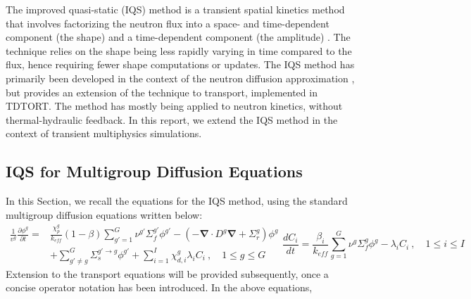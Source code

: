 \documentclass[12pt]{scrartcl}
\renewcommand{\div}{\bs{\nabla}\! \cdot \!}
\newcommand{\grad}{\bs{\nabla}}
\newcommand{\bs}[1]{\mathbf{#1}}
\newcommand{\keff}{k_\textit{eff}}
\newcommand{\be}{\begin{equation}}
\newcommand{\ee}{\end{equation}}
\begin{document}
\par
The improved quasi-static (IQS) method is a transient spatial kinetics method that involves factorizing the neutron flux into a space- and time-dependent component (the shape) and a time-dependent component (the amplitude) \cite{Ott_1966,Dulla2008}. The technique relies on the shape being less rapidly varying in time compared to the flux, hence requiring fewer shape computations or updates. The IQS method has primarily been developed in the context of the neutron diffusion approximation \cite{Ban_2012,Ferguson_1973}, but \cite{Goluoglu_2001} provides an extension of the technique to transport, implemented in TDTORT. The method has mostly being applied to neutron kinetics, without thermal-hydraulic feedback. In this report, we extend the IQS method in the context of transient multiphysics simulations.


\subsection{IQS for Multigroup Diffusion Equations}

In this Section, we recall the equations for the IQS method, using the standard multigroup diffusion equations written below:
\begin{subequations}
\begin{align}
\frac{1}{v^g} \frac{\partial \phi^g }{\partial t} =& \frac{\chi_p^g}{\keff} (1-\beta)\sum_{g'=1}^G  \nu^{g'} \Sigma_f^{g'} \phi^{g'} -  \left( -\div D^g \grad  + \Sigma_r^g \right) \phi^g  \nonumber \\
&  + \sum_{g'\neq g}^G\Sigma_s^{g'\to g} \phi^{g'}  + \sum_{i=1}^I\chi_{d,i}^g\lambda_i C_i \ , \quad 1 \le g \le G 
\label{eq:flux}
\end{align}
\be
\frac{dC_i}{dt} = \frac{\beta_i}{\keff}\sum_{g=1}^G\nu^{g} \Sigma_f^g \phi^{g} - \lambda_i C_i \ , \quad 1 \le i \le I 
\label{eq:precursor}
\ee
\end{subequations}
%
Extension to the transport equations will be provided subsequently, once a concise operator notation has been introduced. 
In the above equations,  \\
\end{document}
